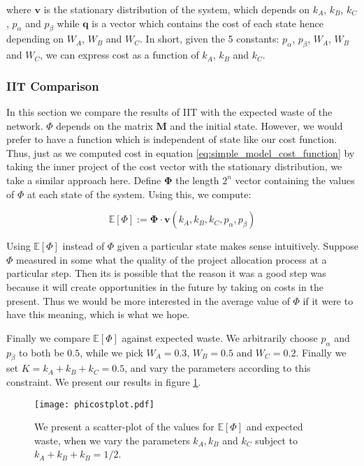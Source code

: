 where $\mathbf{v}$ is the stationary distribution of the system, which depends on $k_A$, $k_B$, $k_C$, $p_\alpha$ and $p_\beta$ while $\mathbf{q}$ is a vector which contains the cost of each state hence depending on $W_A$, $W_B$ and $W_C$. In short, given the 5 constants: $p_\alpha$, $p_\beta$, $W_A$, $W_B$ and $W_C$, we can express cost as a function of $k_A$, $k_B$ and $k_C$. 

\subsubsection{IIT Comparison}

In this section we compare the results of IIT with the expected waste of the network. $\Phi$ depends on the matrix $\mathbf{M}$ and the initial state. However, we would prefer to have a function which is independent of state like our cost function. Thus, just as we computed cost in equation \ref{eq:simple_model_cost_function} by taking the inner project of the cost vector with the stationary distribution, we take a similar approach here.
Define $\mathbf{\Phi}$ the length $2^n$ vector containing the values of $\Phi$ at each state of the system. Using this, we compute:

\begin{equation}
\mathbb{E}[\Phi]:= \mathbf{\Phi}\cdot \mathbf{v}(k_A, k_B, k_C, p_\alpha, p_\beta)
\end{equation}

Using $\mathbb{E}[\Phi]$ instead of $\Phi$ given a particular state makes sense intuitively. Suppose $\Phi$ measured in some what the quality of the project allocation process at a particular step. Then its is possible that the reason it was a good step was because it will create opportunities in the future by taking on costs in the present. Thus we would be more interested in the average value of $\Phi$ if it were to have this meaning, which is what we hope.

Finally we compare $\mathbb{E}[\Phi]$ against expected waste. We arbitrarily choose $p_\alpha$ and $p_\beta$ to both be $0.5$, while we pick $W_A=0.3$, $W_B = 0.5$ and $W_C = 0.2$. Finally we set $K = k_A+k_B+k_C = 0.5$, and vary the parameters according to this constraint. We present our results in figure \ref{fig:simple_model_phi_cost_plot}.

\begin{figure}[!ht]
	\centering
	\texttt{[image: phicostplot.pdf]}
	\caption{We present a scatter-plot of the values for $\mathbb{E}[\Phi]$ and expected waste, when we vary the parameters $k_A, k_B$ and $k_C$ subject to $k_A+k_B+k_B=1/2$.}
	\label{fig:simple_model_phi_cost_plot}
\end{figure}

